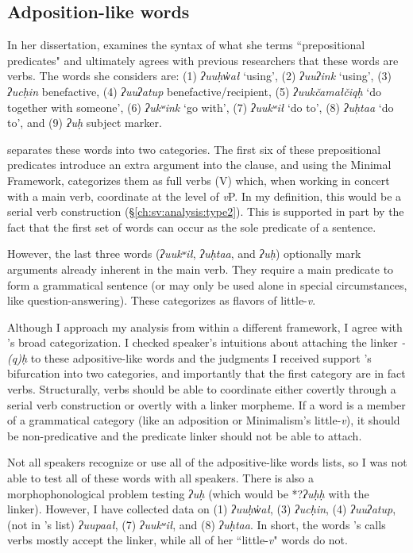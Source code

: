 \subsection{Adposition-like words} \label{ch:link:adpositive}

In her dissertation, \cite{woo2007b} examines the syntax of what she terms ``prepositional predicates" and ultimately agrees with previous researchers that these words are verbs. The words she considers are: (1) \textit{ʔuuḥw̓ał} `using', (2) \textit{ʔuuʔink} `using', (3) \textit{ʔucḥin} benefactive, (4) \textit{ʔuuʔatup} benefactive/recipient, (5) \textit{ʔuukčamałčiqḥ} `do together with someone', (6) \textit{ʔukʷink} `go with', (7) \textit{ʔuukʷił} `do to', (8) \textit{ʔuḥtaa} `do to', and (9) \textit{ʔuḥ} subject marker.

\citeauthor{woo2007b} separates these words into two categories. The first six of these prepositional predicates introduce an extra argument into the clause, and using the Minimal Framework, \citeauthor{woo2007b} categorizes them as full verbs (V) which, when working in concert with a main verb, coordinate at the level of \textit{v}P. In my definition, this would be a serial verb construction (\S\ref{ch:sv:analysis:type2}). This is supported in part by the fact that the first set of words can occur as the sole predicate of a sentence.

However, the  last three words (\textit{ʔuukʷił}, \textit{ʔuḥtaa}, and \textit{ʔuḥ}) optionally mark arguments already inherent in the main verb. They require a main predicate to form a grammatical sentence (or may only be used alone in special circumstances, like question-answering). These \citeauthor{woo2007b} categorizes as flavors of little-\textit{v}.

Although I approach my analysis from within a different framework, I agree with \citeauthor{woo2007b}'s broad categorization. I checked speaker's intuitions about attaching the linker \textit{-(q)ḥ} to these adpositive-like words and the judgments I received support \citeauthor{woo2007b}'s bifurcation into two categories, and importantly that the first category are in fact verbs. Structurally, verbs should be able to coordinate either covertly through a serial verb construction or overtly with a linker morpheme. If a word is a member of a grammatical category (like an adposition or Minimalism's little-\textit{v}), it should be non-predicative and the predicate linker should not be able to attach.

Not all speakers recognize or use all of the adpositive-like words \citeauthor{woo2007b} lists, so I was not able to test all of these words with all speakers. There is also a morphophonological problem testing \textit{ʔuḥ} (which would be *?\textit{ʔuḥḥ} with the linker). However, I have collected data on (1) \textit{ʔuuḥw̓ał}, (3) \textit{ʔucḥin}, (4) \textit{ʔuuʔatup}, (not in \citeauthor{woo2007b}'s list) \textit{ʔuupaał}, (7) \textit{ʔuukʷił}, and (8) \textit{ʔuḥtaa}. In short, the words \citeauthor{woo2007b}'s calls verbs mostly accept the linker, while all of her ``little-\textit{v}" words do not.


